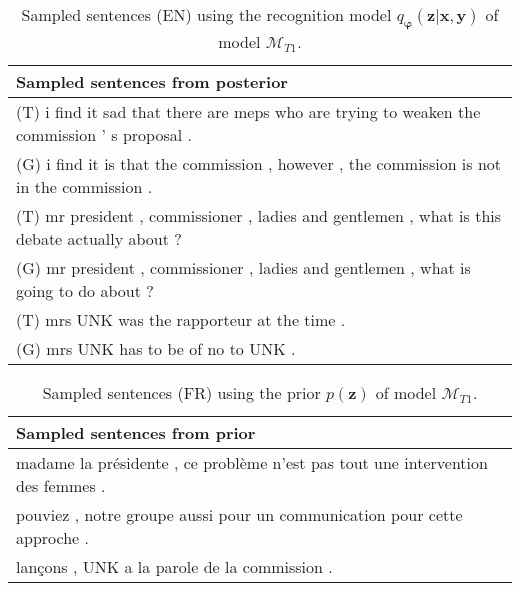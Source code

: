 \begin{table}
  \centering
  \begin{tabular}{|L{14cm}|} 
    \hline
    Sampled sentences from posterior\\ [0.5ex] 
    \hline\hline
    (T) i find it sad that there are meps who are trying to weaken the commission ' s proposal .\\
    (G) i find it is that the commission , however , the commission is not in the commission .\\
    \hline
    (T) mr president , commissioner , ladies and gentlemen , what is this debate actually about ?\\
    (G) mr president , commissioner , ladies and gentlemen , what is going to do about ?\\
    \hline
    (T) mrs UNK was the rapporteur at the time .\\
    (G) mrs UNK has to be of no to UNK .\\
    \hline
  \end{tabular}
  \caption{Sampled sentences (EN) using the recognition model
    $q_{\bm{\varphi}}(\bm{z} | \bm{x}, \bm{y})$ of model $\mathcal{M}_{T1}$.}
\end{table}

\begin{table}
  \centering
  \begin{tabular}{|L{14cm}|} 
    \hline
    Sampled sentences from prior\\ [0.5ex] 
    \hline\hline
    madame la présidente , ce problème n'est pas tout une intervention des femmes .\\
    \hline
    pouviez , notre groupe aussi pour un communication pour cette approche .\\
    \hline
    lançons , UNK a la parole de la commission .\\
    \hline
  \end{tabular}
  \caption{Sampled sentences (FR) using the prior $p(\bm{z})$ of model $\mathcal{M}_{T1}$.}
\end{table}

